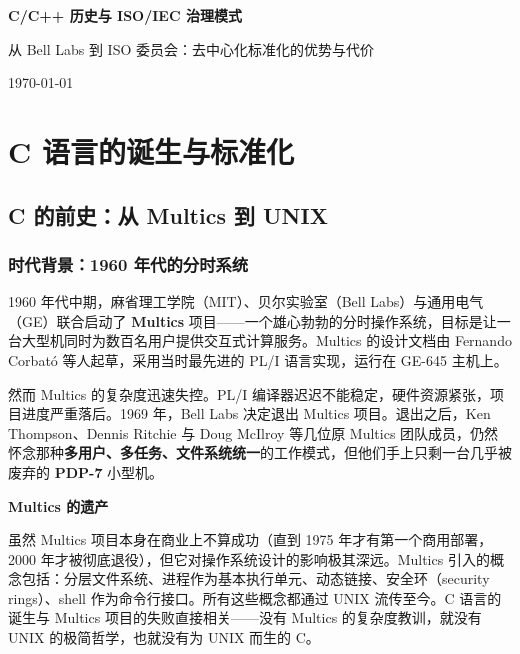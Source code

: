 \documentclass[12pt,a4paper,fontset=fandol]{ctexbook}
\newcommand{\yearlabel}[1]{%
  \tcbox[on line,colback=yearheadbg,colframe=yearheadbg,
    boxrule=0pt,arc=1pt,left=3pt,right=3pt,top=1pt,bottom=1pt,
    colupper=white,fontupper=\scriptsize\bfseries]{#1}}
\newcommand{\yrlbl}[1]{\yearlabel{#1}}
\begin{document}
\frontmatter

\begin{titlepage}
\centering
\vspace*{4cm}
{\Huge\bfseries C/C++ 历史与 ISO/IEC 治理模式\par}
\vspace{1cm}
{\LARGE 从 Bell Labs 到 ISO 委员会：去中心化标准化的优势与代价\par}
\vfill
{\large \today\par}
\end{titlepage}

\tableofcontents

\mainmatter

\part{C 语言的诞生与标准化}

\chapter{C 的前史：从 Multics 到 UNIX}

\section{时代背景：1960 年代的分时系统}

\yrlbl{1965} 1960 年代中期，麻省理工学院（MIT）、贝尔实验室（Bell Labs）与通用电气（GE）联合启动了 \textbf{Multics} 项目——一个雄心勃勃的分时操作系统，目标是让一台大型机同时为数百名用户提供交互式计算服务。Multics 的设计文档由 Fernando Corbató 等人起草，采用当时最先进的 PL/I 语言实现，运行在 GE-645 主机上。

\yrlbl{1969} 然而 Multics 的复杂度迅速失控。PL/I 编译器迟迟不能稳定，硬件资源紧张，项目进度严重落后。1969 年，Bell Labs 决定退出 Multics 项目。退出之后，Ken Thompson、Dennis Ritchie 与 Doug McIlroy 等几位原 Multics 团队成员，仍然怀念那种\textbf{多用户、多任务、文件系统统一}的工作模式，但他们手上只剩一台几乎被废弃的 \textbf{PDP-7} 小型机。

\begin{historybox}
\textbf{Multics 的遗产}

虽然 Multics 项目本身在商业上不算成功（直到 1975 年才有第一个商用部署，2000 年才被彻底退役），但它对操作系统设计的影响极其深远。Multics 引入的概念包括：分层文件系统、进程作为基本执行单元、动态链接、安全环（security rings）、shell 作为命令行接口。所有这些概念都通过 UNIX 流传至今。C 语言的诞生与 Multics 项目的失败直接相关——没有 Multics 的复杂度教训，就没有 UNIX 的极简哲学，也就没有为 UNIX 而生的 C。
\end{historybox}
\end{document}
